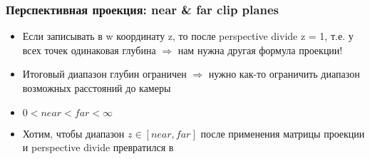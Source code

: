 \documentclass{beamer}
\begin{document}
\begin{frame}[fragile]
\frametitle{Перспективная проекция: near \& far clip planes}
\begin{itemize}
\item Если записывать в w координату z, то после perspective divide z = 1, т.е. у всех точек одинаковая глубина \begin{math}\Rightarrow\end{math} нам нужна другая формула проекции!
\pause
\item Итоговый диапазон глубин ограничен \begin{math}\Rightarrow\end{math} нужно как-то ограничить диапазон возможных расстояний до камеры
\pause
\item \begin{math}0 < near < far < \infty\end{math}
\pause
\item Хотим, чтобы диапазон \begin{math}z\in [near,far]\end{math} после применения матрицы проекции и perspective divide превратился в \begin{math}[-1,1]\end{math}
\end{itemize}
\end{frame}
\end{document}
